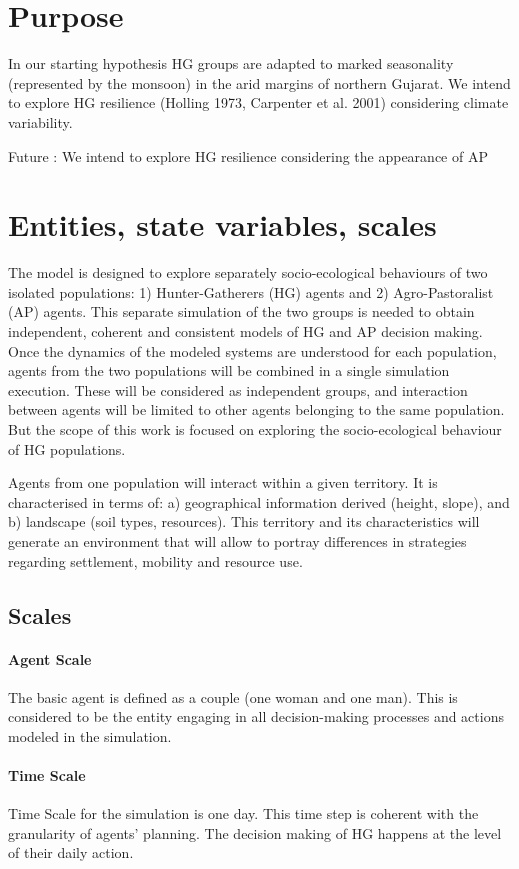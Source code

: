 \documentclass[11pt,oneside,a4paper,openright]{report}
\begin{document}
\section{Purpose}
In our starting hypothesis HG groups are adapted to marked seasonality (represented by the
monsoon) in the arid margins of northern Gujarat. We intend to explore HG resilience (Holling 1973,
Carpenter et al. 2001) considering climate variability.

Future : We intend to explore HG resilience considering the appearance of AP

\section{Entities, state variables, scales}


The model is designed to explore separately socio-ecological behaviours of two isolated populations: 1)
Hunter-Gatherers (HG) agents and 2) Agro-Pastoralist (AP) agents. This separate simulation of the
two groups is needed to obtain independent, coherent and consistent models of HG and AP decision
making. Once the dynamics of the modeled systems are understood for each population, agents from
the two populations will be combined in a single simulation execution. These will be considered as
independent groups, and interaction between agents will be limited to other agents belonging to the
same population. But the scope of this work is focused on exploring the socio-ecological behaviour of HG populations.

Agents from one population will interact within a given territory. It is characterised in terms of: a)
geographical information derived (height, slope), and b) landscape (soil types, resources). This
territory and its characteristics will generate an environment that will allow to portray differences in
strategies regarding settlement, mobility and resource use.


\subsection{Scales}
\paragraph{Agent Scale}
The basic agent is defined as a couple (one woman and one man). This is considered to be the entity
engaging in all decision-making processes and actions modeled in the simulation.
\paragraph{Time Scale}
Time Scale for the simulation is one day. This time step is coherent with the granularity of agents’
planning. The decision making of HG happens at the level of their daily action.
\end{document}
